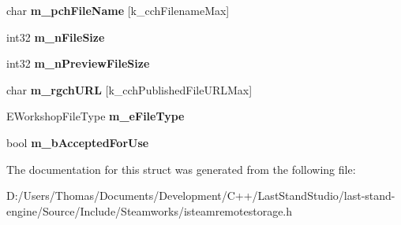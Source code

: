 \begin{DoxyCompactItemize}
\item 
\hypertarget{structRemoteStorageGetPublishedFileDetailsResult__t_a1296b51e21c7e45687c5b809983d0e1a}{}char {\bfseries m\+\_\+pch\+File\+Name} \mbox{[}k\+\_\+cch\+Filename\+Max\mbox{]}\label{structRemoteStorageGetPublishedFileDetailsResult__t_a1296b51e21c7e45687c5b809983d0e1a}

\item 
\hypertarget{structRemoteStorageGetPublishedFileDetailsResult__t_a58703e19ebeb6179c29b590ffdf611c8}{}int32 {\bfseries m\+\_\+n\+File\+Size}\label{structRemoteStorageGetPublishedFileDetailsResult__t_a58703e19ebeb6179c29b590ffdf611c8}

\item 
\hypertarget{structRemoteStorageGetPublishedFileDetailsResult__t_a96265c14a0a5a291ef4ed910c3f9a81b}{}int32 {\bfseries m\+\_\+n\+Preview\+File\+Size}\label{structRemoteStorageGetPublishedFileDetailsResult__t_a96265c14a0a5a291ef4ed910c3f9a81b}

\item 
\hypertarget{structRemoteStorageGetPublishedFileDetailsResult__t_a637b2b0c2260fd13cb55fbe5c6de22b8}{}char {\bfseries m\+\_\+rgch\+U\+R\+L} \mbox{[}k\+\_\+cch\+Published\+File\+U\+R\+L\+Max\mbox{]}\label{structRemoteStorageGetPublishedFileDetailsResult__t_a637b2b0c2260fd13cb55fbe5c6de22b8}

\item 
\hypertarget{structRemoteStorageGetPublishedFileDetailsResult__t_a9a561bba9106d99d4278cb3bbe1a98b7}{}E\+Workshop\+File\+Type {\bfseries m\+\_\+e\+File\+Type}\label{structRemoteStorageGetPublishedFileDetailsResult__t_a9a561bba9106d99d4278cb3bbe1a98b7}

\item 
\hypertarget{structRemoteStorageGetPublishedFileDetailsResult__t_a7c8468d3f88dfc9339f315104d8b9be5}{}bool {\bfseries m\+\_\+b\+Accepted\+For\+Use}\label{structRemoteStorageGetPublishedFileDetailsResult__t_a7c8468d3f88dfc9339f315104d8b9be5}

\end{DoxyCompactItemize}


The documentation for this struct was generated from the following file\+:\begin{DoxyCompactItemize}
\item 
D\+:/\+Users/\+Thomas/\+Documents/\+Development/\+C++/\+Last\+Stand\+Studio/last-\/stand-\/engine/\+Source/\+Include/\+Steamworks/isteamremotestorage.\+h\end{DoxyCompactItemize}
